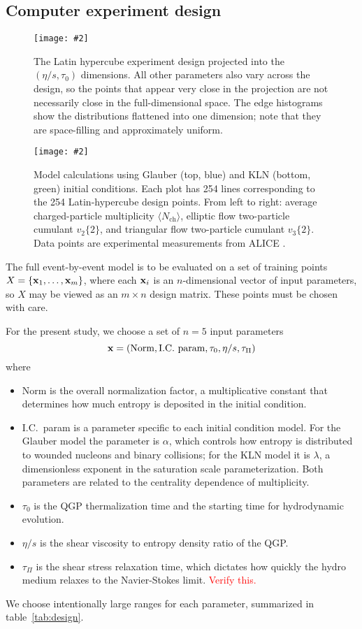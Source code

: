 \documentclass[aps,prc,reprint,superscriptaddress,amsmath]{revtex4-1}
\newcommand{\todo}[1]{\textcolor{red}{#1}}
\newcommand{\colfig}[3][t]{
  \begin{figure}[#1]
    \texttt{[image: \#2]}
    \caption{\label{fig:#2}#3}
  \end{figure}
}
\newcommand{\widefig}[3][t]{
  \begin{figure*}[#1]
    \texttt{[image: \#2]}
    \caption{\label{fig:#2}#3}
  \end{figure*}
}
\newcommand{\avg}[1]{\langle #1 \rangle}
\newcommand{\nch}{N_\text{ch}}
\newcommand{\vnk}[2]{v_#1\{#2\}}
\begin{document}
\subsection{Computer experiment design}

\colfig[b]{design}{
  The Latin hypercube experiment design projected into the $(\eta/s, \tau_0)$ dimensions.
  All other parameters also vary across the design, so the points that appear very close in the projection are not necessarily close in the full-dimensional space.
  The edge histograms show the distributions flattened into one dimension; note that they are space-filling and approximately uniform.
}

\widefig{prior_draws}{
  Model calculations using Glauber (top, blue) and KLN (bottom, green) initial conditions.
  Each plot has 254 lines corresponding to the 254 Latin-hypercube design points.
  From left to right:
  average charged-particle multiplicity $\avg\nch$,
  elliptic flow two-particle cumulant $\vnk 2 2$,
  and triangular flow two-particle cumulant $\vnk 3 2$.
  Data points are experimental measurements from ALICE \cite{Abelev:2014mda}.
}

The full event-by-event model is to be evaluated on a set of training points $X = \{\mathbf x_1, \ldots, \mathbf x_m\}$, where each $\mathbf x_i$ is an $n$-dimensional vector of input parameters, so $X$ may be viewed as an $m \times n$ design matrix.
These points must be chosen with care.

For the present study, we choose a set of $n = 5$ input parameters
\begin{equation}
  \mathbf x = (\text{Norm}, \text{I.C.\ param}, \tau_0, \eta/s, \tau_\Pi)
\end{equation}
where
\begin{itemize}
  \item Norm is the overall normalization factor, a multiplicative constant that determines how much entropy is deposited in the initial condition.
  \item I.C.\ param is a parameter specific to each initial condition model.
    For the Glauber model the parameter is $\alpha$, which controls how entropy is distributed to wounded nucleons and binary collisions;
    for the KLN model it is $\lambda$, a dimensionless exponent in the saturation scale parameterization.
    Both parameters are related to the centrality dependence of multiplicity.
  \item $\tau_0$ is the QGP thermalization time and the starting time for hydrodynamic evolution.
  \item $\eta/s$ is the shear viscosity to entropy density ratio of the QGP.
  \item $\tau_\Pi$ is the shear stress relaxation time, which dictates how quickly the hydro medium relaxes to the Navier-Stokes limit.
    \todo{Verify this.}
\end{itemize}
We choose intentionally large ranges for each parameter, summarized in table~\ref{tab:design}.
\end{document}
